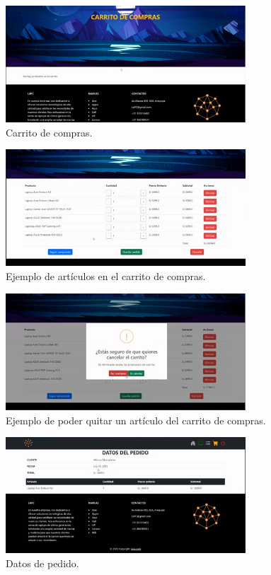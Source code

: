 \documentclass{article}
\begin{document}
    \begin{figure}[H]
		\centering
        \includegraphics[width=0.8\textwidth,keepaspectratio]{img/a6.jpeg}
		\caption{Carrito de compras.}
    \end{figure}
    \begin{figure}[H]
		\centering
        \includegraphics[width=0.8\textwidth,keepaspectratio]{img/a7.jpeg}
		\caption{Ejemplo de artículos en el carrito de compras.}
    \end{figure}
    \begin{figure}[H]
		\centering
        \includegraphics[width=0.8\textwidth,keepaspectratio]{img/a8.jpeg}
		\caption{Ejemplo de poder quitar un artículo del carrito de compras.}
    \end{figure}
    \begin{figure}[H]
		\centering
        \includegraphics[width=0.8\textwidth,keepaspectratio]{img/a9.jpeg}
		\caption{Datos de pedido.}
    \end{figure}
\end{document}
